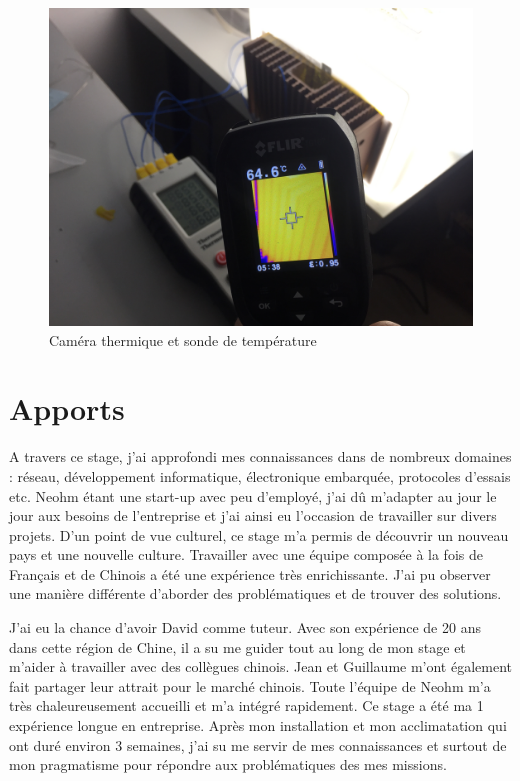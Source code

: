 \documentclass[a4paper, 12pt, sffamily]{report}
\begin{document}
\begin{figure}[H]
\centering
\includegraphics[scale=0.08]{figures/photos/thermal_camera.jpg}
\caption{Caméra thermique et sonde de température}
\label{fig:temp_test}
\end{figure}



\chapter{Apports}

A travers ce stage, j'ai approfondi mes connaissances dans de nombreux domaines : réseau, développement informatique, électronique embarquée, protocoles d'essais etc. Neohm étant une start-up avec peu d'employé, j'ai dû m'adapter au jour le jour aux besoins de l'entreprise et j'ai ainsi eu l'occasion de travailler sur divers projets. D'un point de vue culturel, ce stage m'a permis de découvrir un nouveau pays et une nouvelle culture. Travailler avec une équipe composée à la fois de Français et de Chinois a été une expérience très enrichissante. J'ai pu observer une manière différente d'aborder des problématiques et de trouver des solutions.

J'ai eu la chance d'avoir David comme tuteur. Avec son expérience de 20 ans dans cette région de Chine, il a su me guider tout au long de mon stage et m'aider à travailler avec des collègues chinois. Jean et Guillaume m'ont également fait partager leur attrait pour le marché chinois. Toute l'équipe de Neohm m'a très chaleureusement accueilli et m'a intégré rapidement.
Ce stage a été ma 1\ieme{} expérience longue en entreprise. Après mon installation et mon acclimatation qui ont duré environ 3 semaines, j'ai su me servir de mes connaissances et surtout de mon pragmatisme pour répondre aux problématiques des mes missions.
\end{document}
